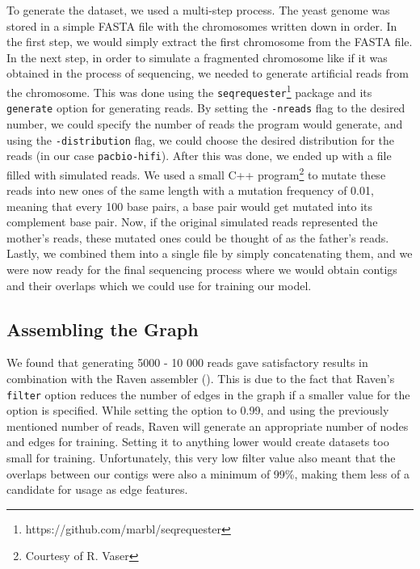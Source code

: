 \documentclass[times, utf8, diplomski, english]{fer_eng}
\begin{document}
To generate the dataset, we used a multi-step process. The yeast genome was stored in a simple FASTA file with the chromosomes written down in order. In the first step, we would simply extract the first chromosome from the FASTA file. In the next step, in order to simulate a fragmented chromosome like if it was obtained in the process of sequencing, we needed to generate artificial reads from the chromosome. This was done using the \texttt{seqrequester}\footnote{https://github.com/marbl/seqrequester} package and its \texttt{generate} option for generating reads. By setting the \texttt{-nreads} flag to the desired number, we could specify the number of reads the program would generate, and using the \texttt{-distribution} flag, we could choose the desired distribution for the reads (in our case \texttt{pacbio-hifi}). After this was done, we ended up with a file filled with simulated reads. We used a small C++ program\footnote{Courtesy of R. Vaser} to mutate these reads into new ones of the same length with a mutation frequency of 0.01, meaning that every 100 base pairs, a base pair would get mutated into its complement base pair. Now, if the original simulated reads represented the mother's reads, these mutated ones could be thought of as the father's reads. Lastly, we combined them into a single file by simply concatenating them, and we were now ready for the final sequencing process where we would obtain contigs and their overlaps which we could use for training our model.

\subsection{Assembling the Graph}

We found that generating 5000 - 10 000 reads gave satisfactory results in combination with the Raven assembler (\cite{Vaser}). This is due to the fact that Raven's \texttt{filter} option reduces the number of edges in the graph if a smaller value for the option is specified. While setting the option to 0.99, and using the previously mentioned number of reads, Raven will generate an appropriate number of nodes and edges for training. Setting it to anything lower would create datasets too small for training. Unfortunately, this very low filter value also meant that the overlaps between our contigs were also a minimum of 99\%, making them less of a candidate for usage as edge features.
\end{document}
